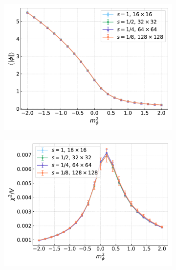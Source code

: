 \begin{figure}[hbp]
    \centering
    \begin{subfigure}[b]{0.48\textwidth}
        \includegraphics[width=1.05\textwidth]{figures/cooling/mass_scan/magnetisation.pdf}
    \end{subfigure}
    \hfill
    \begin{subfigure}[b]{0.48\textwidth}
        \includegraphics[width=1.05\textwidth]{figures/cooling/mass_scan/susceptibility.pdf}
    \end{subfigure}
    \\
    \vspace{10pt}
    \begin{subfigure}[b]{0.48\textwidth}

\end{subfigure}
\end{figure}
